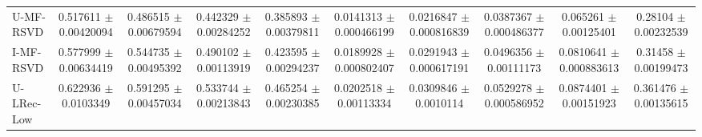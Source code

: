\begin{table*}
{\begin{tabular}{l|cccc|cccc|c}

		

		U-MF-RSVD & \num{0.517611} $\pm$ \num{0.00420094}&\num{0.486515} $\pm$ \num{0.00679594}&\num{0.442329} $\pm$ \num{0.00284252}&\num{0.385893} $\pm$ \num{0.00379811}&\num{0.0141313} $\pm$ \num{0.000466199}&\num{0.0216847} $\pm$ \num{0.000816839}&\num{0.0387367} $\pm$ \num{0.000486377}&\num{0.065261} $\pm$ \num{0.00125401}&\num{0.28104} $\pm$ \num{0.00232539} \\

		I-MF-RSVD & \num{0.577999} $\pm$ \num{0.00634419}&\num{0.544735} $\pm$ \num{0.00495392}&\num{0.490102} $\pm$ \num{0.00113919}&\num{0.423595} $\pm$ \num{0.00294237}&\num{0.0189928} $\pm$ \num{0.000802407}&\num{0.0291943} $\pm$ \num{0.000617191}&\num{0.0496356} $\pm$ \num{0.00111173}&\num{0.0810641} $\pm$ \num{0.000883613}&\num{0.31458} $\pm$ \num{0.00199473}\\
		
		U-LRec-Low & \num{0.622936} $\pm$ \num{0.0103349}&\num{0.591295} $\pm$ \num{0.00457034}&\num{0.533744} $\pm$ \num{0.00213843}&\num{0.465254} $\pm$ \num{0.00230385}&\num{0.0202518} $\pm$ \num{0.00113334}&\num{0.0309846} $\pm$ \num{0.0010114}&\num{0.0529278} $\pm$ \num{0.000586952}&\num{0.0874401} $\pm$ \num{0.00151923}&\num{0.361476} $\pm$ \num{0.00135615} \\


\end{tabular}}
\end{table*}

